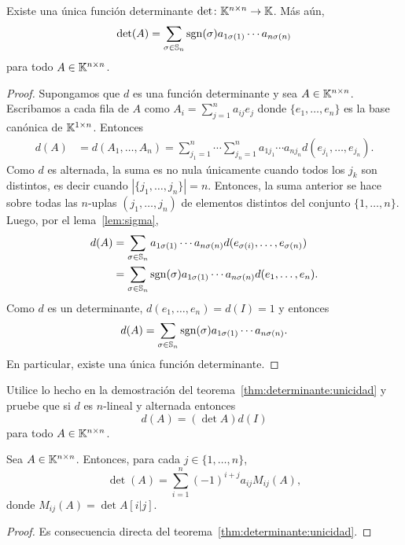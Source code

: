 \begin{thm}
    \label{thm:determinante:unicidad}
    Existe una única función determinante $\det\colon\mathbb{K}^{n\times n}\to\mathbb{K}$. Más
    aún, 
    \begin{equation}
        \label{eq:det:permutaciones}
        \det(A)=\sum_{\sigma\in\mathbb{S}_n}\operatorname{sgn}(\sigma)a_{1\sigma(1)}\cdots a_{n\sigma(n)}
    \end{equation}
    para todo $A\in\mathbb{K}^{n\times n}$. 

    \begin{proof}
        Supongamos que $d$ es una función determinante y sea $A\in\mathbb{K}^{n\times
        n}$. Escribamos a cada fila de $A$ como $A_i=\sum_{j=1}^n a_{ij}e_j$
        donde $\{e_1,\dots,e_n\}$ es la base canónica de $\mathbb{K}^{1\times n}$.
        Entonces
		\begin{align*}
			d(A)&=d(A_1,\dots,A_n)
			=\sum_{j_1=1}^n\cdots\sum_{j_n=1}^na_{1j_1}\cdots a_{nj_n}d(e_{j_1},\dots,e_{j_n}).
		\end{align*}
        Como $d$ es alternada, la suma es no nula únicamente cuando todos los
        $j_k$ son distintos, es decir cuando $|\{j_1,\dots,j_n\}|=n$. Entonces,
        la suma anterior se hace sobre todas las $n$-uplas $(j_1,\dots,j_n)$ de
        elementos distintos del conjunto $\{1,\dots,n\}$. Luego, por el
        lema~\ref{lem:sigma},  
		\begin{align*} 
			d(A)&=\sum_{\sigma\in\mathbb{S}_n}a_{1\sigma(1)}\cdots a_{n\sigma(n)}d(e_{\sigma(i)},\dots,e_{\sigma(n)})\\
			&=\sum_{\sigma\in\mathbb{S}_n}\operatorname{sgn}(\sigma)a_{1\sigma(1)}\cdots a_{n\sigma(n)}d(e_1,\dots,e_n).
		\end{align*}
        Como $d$ es un determinante, $d(e_1,\dots,e_n)=d(I)=1$ y entonces 
        \[
            d(A)=\sum_{\sigma\in\mathbb{S}_n}\operatorname{sgn}(\sigma)a_{1\sigma(1)}\cdots a_{n\sigma(n)}.
        \]
		En particular, existe una única función determinante. 
	\end{proof}
\end{thm}

\begin{xca}
    \label{xca:dA=(detA)dI}
    Utilice lo hecho en la demostración del teorema~\ref{thm:determinante:unicidad}
    y pruebe que si $d$ es $n$-lineal y alternada entonces
    \[
        d(A)=(\det A)d(I)
    \]
    para todo $A\in\mathbb{K}^{n\times n}$. 
\end{xca}

\begin{cor}
    Sea $A\in\mathbb{K}^{n\times n}$. Entonces, para cada $j\in\{1,\dots,n\}$, 
    \[
    \det(A)=\sum_{i=1}^n(-1)^{i+j}a_{ij}M_{ij}(A),
    \]
    donde $M_{ij}(A)=\det A[i|j]$. 

	\begin{proof}
		Es consecuencia directa del 
		teorema~\ref{thm:determinante:unicidad}. 
	\end{proof}
\end{cor}


